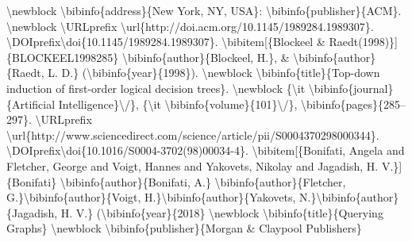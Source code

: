 \documentclass{article}%
\begin{document}
\textbackslash{}newblock \textbackslash{}bibinfo\{address\}\{New York, NY, USA\}: \textbackslash{}bibinfo\{publisher\}\{ACM\}.\newline%
\textbackslash{}newblock \textbackslash{}URLprefix \textbackslash{}url\{http://doi.acm.org/10.1145/1989284.1989307\}.\newline%
\textbackslash{}DOIprefix\textbackslash{}doi\{10.1145/1989284.1989307\}.\newline%
\textbackslash{}bibitem{[}\{Blockeel \& Raedt(1998)\}{]}\{BLOCKEEL1998285\}\newline%
\textbackslash{}bibinfo\{author\}\{Blockeel, H.\}, \& \textbackslash{}bibinfo\{author\}\{Raedt, L. D.\}\newline%
(\textbackslash{}bibinfo\{year\}\{1998\}).\newline%
\textbackslash{}newblock \textbackslash{}bibinfo\{title\}\{Top{-}down induction of first{-}order logical decision\newline%
trees\}.\newline%
\textbackslash{}newblock \{\textbackslash{}it \textbackslash{}bibinfo\{journal\}\{Artificial Intelligence\}\textbackslash{}/\}, \{\textbackslash{}it\newline%
\textbackslash{}bibinfo\{volume\}\{101\}\textbackslash{}/\}, \textbackslash{}bibinfo\{pages\}\{285–297\}. \textbackslash{}URLprefix\newline%
\textbackslash{}url\{http://www.sciencedirect.com/science/article/pii/S0004370298000344\}.\newline%
\textbackslash{}DOIprefix\textbackslash{}doi\{10.1016/S0004{-}3702(98)00034{-}4\}.\newline%
\newline%
\textbackslash{}bibitem{[}\{Bonifati, Angela and Fletcher, George and Voigt, Hannes and Yakovets, Nikolay and Jagadish, H. V.\}{]}\{Bonifati\}\newline%
\textbackslash{}bibinfo\{author\}\{Bonifati, A.\} \textbackslash{}bibinfo\{author\}\{Fletcher, G.\}\textbackslash{}bibinfo\{author\}\{Voigt, H.\}\textbackslash{}bibinfo\{author\}\{Yakovets, N.\}\textbackslash{}bibinfo\{author\}\{Jagadish, H. V.\} (\textbackslash{}bibinfo\{year\}\{2018\}\newline%
\textbackslash{}newblock \textbackslash{}bibinfo\{title\}\{Querying Graphs\}\newline%
\textbackslash{}newblock \textbackslash{}bibinfo\{publisher\}\{Morgan \& Claypool Publishers\}\newline%
\newline%
\end{document}
